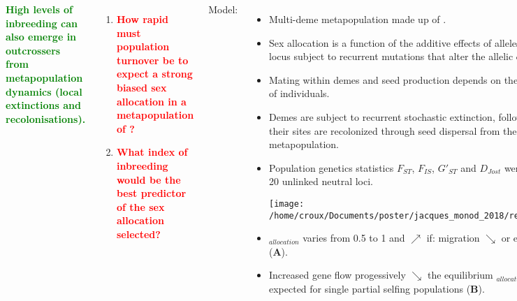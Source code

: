 \documentclass[25pt, a0paper, portrait, margin=0mm, innermargin=15mm,
     blockverticalspace=15mm, colspace=15mm, subcolspace=8mm]{tikzposter}
\begin{document}
\begin{columns}

{
\textbf{\large \textcolor{green}{High levels of inbreeding can also emerge in outcrossers from metapopulation dynamics (local extinctions and recolonisations).}}

\begin{enumerate}
\item
\textbf{\large \textcolor{red}{How rapid must population turnover be to expect a strong biased sex allocation in a metapopulation of {\LARGE\Hermaphrodite}?}}
\item 
\textbf{\large \textcolor{red}{What index of inbreeding would be the best predictor of the sex allocation selected?}}
\end{enumerate}
}




{
Model:
\begin{itemize}
  \item Multi-deme metapopulation made up of {\Large\Hermaphrodite}.
  \item Sex allocation is a function of the additive effects of alleles at a single locus subject to recurrent mutations that alter the allelic effects.
  \item Mating within demes and seed production depends on the sex allocations of individuals.	
  \item Demes are subject to recurrent stochastic extinction, following which their sites are recolonized through seed dispersal from the rest of the metapopulation.
  \item Population genetics statistics $F_{ST}$, $F_{IS}$, $G'_{ST}$ and $D_{Jost}$ were computed at 20 unlinked neutral loci.


   \begin{center}
   \texttt{[image: /home/croux/Documents/poster/jacques\_monod\_2018/results\_v2.pdf]}
   \end{center}

   \item \faVenus$_{allocation}$ varies from 0.5 to 1 and $\nearrow$ if: migration $\searrow$ or extinction $\nearrow$ (\textbf{A}).
   \item Increased gene flow progessively $\searrow$ the equilibrium \faVenus$_{allocation}$ to values expected for single partial selfing populations (\textbf{B}).
\end{itemize}
}



\end{columns}
\end{document}
